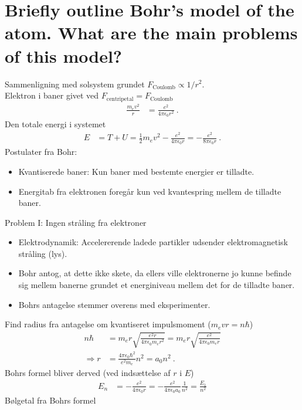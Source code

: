\section{Briefly outline Bohr's model of the atom. What are the main problems of this model?}

\noindent
\large
Sammenligning med solsystem grundet $F_\text{Coulomb} \propto 1/r^2$.\\
Elektron i baner givet ved $F_\text{centripetal} = F_\text{Coulomb}$
\begin{align*}
    \frac{m_e v^2}{r} &= \frac{e^2}{4\pi\epsilon_0 r^2} \: .
\end{align*}
Den totale energi i systemet
\begin{align*}
    E &= T + U = \frac{1}{2}m_e v^2 - \frac{e^2}{4\pi\epsilon_0 r} = - \frac{e^2}{8\pi\epsilon_0 r} \: .
\end{align*}
Postulater fra Bohr:
\begin{itemize}
    \item Kvantiserede baner: Kun baner med bestemte energier er tilladte.
    \item Energitab fra elektronen foregår kun ved kvantespring mellem de tilladte baner.
\end{itemize}
Problem I: Ingen stråling fra elektroner
\begin{itemize}
    \item Elektrodynamik: Accelererende ladede partikler udsender elektromagnetisk stråling (lys).
    \item Bohr antog, at dette ikke skete, da ellers ville elektronerne jo kunne befinde sig mellem banerne grundet et energiniveau mellem det for de tilladte baner.
    \item Bohrs antagelse stemmer overens med eksperimenter.
\end{itemize}
Find radius fra antagelse om kvantiseret impulsmoment ($m_e v r = n\hbar$)
\begin{align*}
    n\hbar &= m_e r \sqrt{\frac{e^2 r}{4\pi\epsilon_0 m_e r^2}} = m_e r \sqrt{\frac{e^2}{4\pi\epsilon_0 m_e r}} \\
    \Rightarrow r &= \frac{4\pi\epsilon_0 \hbar^2}{e^2 m_e}n^2 = a_0 n^2 \: .
\end{align*}
Bohrs formel bliver derved (ved indsættelse af $r$ i $E$)
\begin{align*}
    E_n &= - \frac{e^2}{4\pi\epsilon_0 r} = - \frac{e^2}{4\pi\epsilon_0 a_0} \frac{1}{n^2} = \frac{E_1}{n^2}
\end{align*}
Bølgetal fra Bohrs formel
